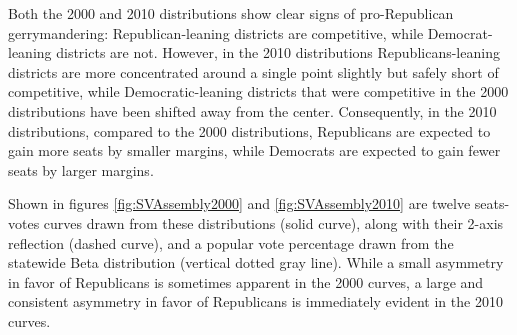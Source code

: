\documentclass[preprint,12pt]{article}
\begin{document}
Both the 2000 and 2010 distributions show clear signs of pro-Republican gerrymandering: Republican-leaning districts are competitive, while Democrat-leaning districts are not.
However, in the 2010 distributions Republicans-leaning districts are more concentrated around a single point slightly but safely short of competitive, while Democratic-leaning districts that were competitive in the 2000 distributions have been shifted away from the center.
Consequently, in the 2010 distributions, compared to the 2000 distributions, Republicans are expected to gain more seats by smaller margins, while Democrats are expected to gain fewer seats by larger margins.

Shown in figures \ref{fig:SVAssembly2000} and \ref{fig:SVAssembly2010} are twelve seats-votes curves drawn from these distributions (solid curve), along with their 2-axis reflection (dashed curve), and a popular vote percentage drawn from the statewide Beta distribution (vertical dotted gray line). 
While a small asymmetry in favor of Republicans is sometimes apparent in the 2000 curves, a large and consistent asymmetry in favor of Republicans is immediately evident in the 2010 curves.
\end{document}
